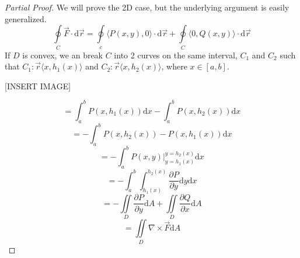 \begin{proof}[Partial Proof]
	We will prove the 2D case, but the underlying argument is easily generalized.
	\begin{equation*}
		\oint\limits_{C}{\vec{F} \cdot \mathrm{d}\vec{r}} = \oint\limits_{c}{\langle P(x,y), 0 \rangle \cdot \mathrm{d}\vec{r}} + \oint\limits_{C}{\langle 0, Q(x,y) \rangle \cdot \mathrm{d}\vec{r}}
	\end{equation*}
	If $D$ is convex, we an break $C$ into 2 curves on the same interval, $C_1$ and $C_2$ such that $C_1 : \vec{r} \langle x, h_1(x) \rangle$ and $C_2 : \vec{r} \langle x, h_2(x) \rangle$, where $x \in [a,b]$.
	
	[INSERT IMAGE]
	
	\begin{equation*}
		= \int_{a}^{b}{P(x,h_1(x))\mathrm{d}x} - \int_{a}^{b}{P(x,h_2(x))\mathrm{d}x}
	\end{equation*} \begin{equation*}
		= -\int_{a}^{b}{P(x,h_2(x)) - P(x,h_1(x))\mathrm{d}x}
	\end{equation*} \begin{equation*}
		= -\int_{a}^{b}{P(x,y)\rvert_{y=h_1(x)}^{y=h_2(x)}\mathrm{d}x}
	\end{equation*} \begin{equation*}
		= -\int_{a}^{b}{\int_{h_1(x)}^{h_2(x)}{\frac{\partial P}{\partial y}\mathrm{d}y}\mathrm{d}x}
	\end{equation*} \begin{equation*}
		= -\iint\limits_{D}{\frac{\partial P}{\partial y}\mathrm{d}A} + \iint\limits_{D}{\frac{\partial Q}{\partial x}\mathrm{d}A}
	\end{equation*} \begin{equation*}
		= \iint\limits_{D}{\nabla \times \vec{F}\mathrm{d}A}
	\end{equation*}
\end{proof}


